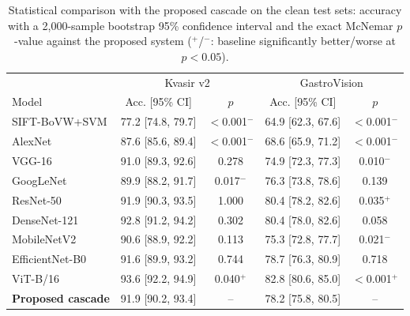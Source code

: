 \begin{table}[t]
\caption{Statistical comparison with the proposed cascade on the clean test sets: accuracy with a 2,000-sample
bootstrap 95\% confidence interval and the exact McNemar $p$-value against the proposed system ($^{+}$/$^{-}$: baseline
significantly better/worse at $p<0.05$).}
\label{tab:stats}\centering\setlength{\tabcolsep}{4pt}
\begin{tabular}{lcccc}\toprule
 & \multicolumn{2}{c}{Kvasir v2} & \multicolumn{2}{c}{GastroVision}\\
Model & Acc. [95\% CI] & $p$ & Acc. [95\% CI] & $p$\\\midrule
SIFT-BoVW+SVM & 77.2 [74.8, 79.7] & $<$0.001$^{-}$ & 64.9 [62.3, 67.6] & $<$0.001$^{-}$\\
AlexNet & 87.6 [85.6, 89.4] & $<$0.001$^{-}$ & 68.6 [65.9, 71.2] & $<$0.001$^{-}$\\
VGG-16 & 91.0 [89.3, 92.6] & 0.278 & 74.9 [72.3, 77.3] & 0.010$^{-}$\\
GoogLeNet & 89.9 [88.2, 91.7] & 0.017$^{-}$ & 76.3 [73.8, 78.6] & 0.139\\
ResNet-50 & 91.9 [90.3, 93.5] & 1.000 & 80.4 [78.2, 82.6] & 0.035$^{+}$\\
DenseNet-121 & 92.8 [91.2, 94.2] & 0.302 & 80.4 [78.0, 82.6] & 0.058\\
MobileNetV2 & 90.6 [88.9, 92.2] & 0.113 & 75.3 [72.8, 77.7] & 0.021$^{-}$\\
EfficientNet-B0 & 91.6 [89.9, 93.2] & 0.744 & 78.7 [76.3, 80.9] & 0.718\\
ViT-B/16 & 93.6 [92.2, 94.9] & 0.040$^{+}$ & 82.8 [80.6, 85.0] & $<$0.001$^{+}$\\\midrule
\textbf{Proposed cascade} & 91.9 [90.2, 93.4] & -- & 78.2 [75.8, 80.5] & --\\
\bottomrule\end{tabular}\end{table}
